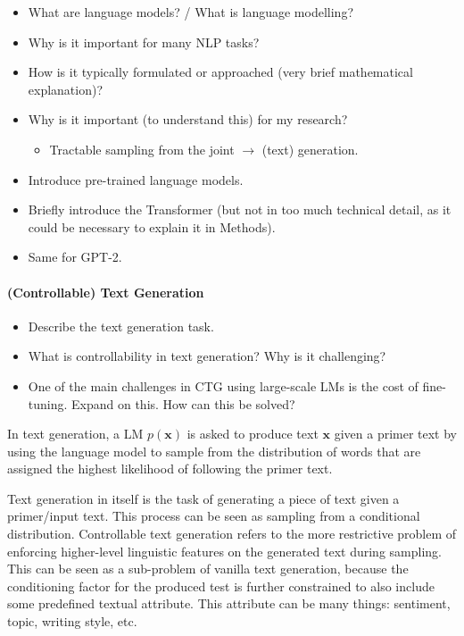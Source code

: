 \begin{itemize}
    \item What are language models? / What is language modelling?
    \item Why is it important for many NLP tasks?
    \item How is it typically formulated or approached (very brief mathematical explanation)?
    \item Why is it important (to understand this) for my research?
    \begin{itemize}
        \item Tractable sampling from the joint $\rightarrow$ (text) generation.
    \end{itemize}
    \item Introduce pre-trained language models.
    \item Briefly introduce the Transformer (but not in too much technical detail, as it could be necessary to explain it in Methods).
    \item Same for GPT-2.
\end{itemize}

\paragraph{(Controllable) Text Generation}

\begin{itemize}
    \item Describe the text generation task.
    \item What is controllability in text generation? Why is it challenging?
    \item One of the main challenges in CTG using large-scale LMs is the cost of fine-tuning. Expand on this. How can this be solved?
\end{itemize}

In text generation, a LM $p(\textbf{x})$ is asked to produce text $\textbf{x}$ given a primer text by using the language model to sample from the distribution of words that are assigned the highest likelihood of following the primer text.

Text generation in itself is the task of generating a piece of text given a primer/input text. This process can be seen as sampling from a conditional distribution. Controllable text generation refers to the more restrictive problem of enforcing higher-level linguistic features on the generated text during sampling. This can be seen as a sub-problem of vanilla text generation, because the conditioning factor for the produced test is further constrained to also include some predefined textual attribute. This attribute can be many things: sentiment, topic, writing style, etc. 

